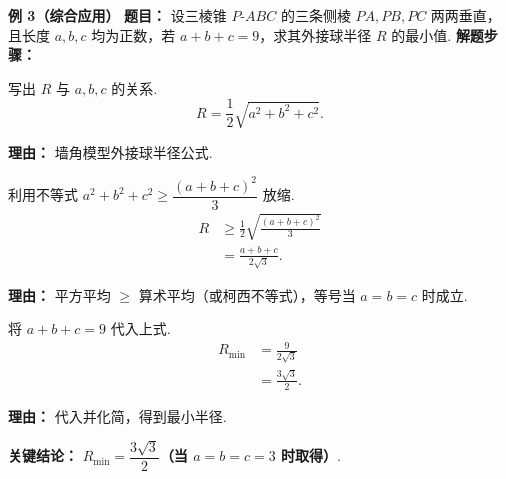\begin{examplebox}
	\medskip
	\textbf{\textcolor{CExample}{例 3（综合应用）}}
	\textbf{\textcolor{CExample}{题目：}}
	设三棱锥 $P$-$ABC$ 的三条侧棱 $PA,PB,PC$ 两两垂直，且长度 $a,b,c$ 均为正数，若 $a+b+c = 9$，求其外接球半径 $R$ 的最小值.
	\textbf{\textcolor{CExample}{解题步骤：}}
	\begin{description}[style=nextline, leftmargin=2.8em, labelsep=0.5em, itemsep=0.45em]
		\item[\textbf{第一步（半径公式）：}]
			写出 $R$ 与 $a,b,c$ 的关系.
			\[
				R = \frac{1}{2}\sqrt{a^{2}+b^{2}+c^{2}}.
			\]
			\par\textbf{理由：} 墙角模型外接球半径公式.
		\item[\textbf{第二步（不等式放缩）：}]
			利用不等式 $a^{2}+b^{2}+c^{2} \ge \dfrac{(a+b+c)^{2}}{3}$ 放缩.
			\[
				\begin{aligned}
					R &\ge \frac{1}{2}\sqrt{\frac{(a+b+c)^{2}}{3}} \\ &= \frac{a+b+c}{2\sqrt{3}}.
			\end{aligned}
			\]
			\par\textbf{理由：} 平方平均 $\ge$ 算术平均（或柯西不等式），等号当 $a=b=c$ 时成立.
		\item[\textbf{第三步（代入定值）：}]
			将 $a+b+c = 9$ 代入上式.
			\[
				\begin{aligned}
					R_{\min} &= \frac{9}{2\sqrt{3}} \\ &= \frac{3\sqrt{3}}{2}.
			\end{aligned}
			\]
			\par\textbf{理由：} 代入并化简，得到最小半径.
	\end{description}
	\textbf{\textcolor{CExample}{关键结论：}}
	\textbf{$R_{\min} = \dfrac{3\sqrt{3}}{2}$（当 $a=b=c=3$ 时取得）}.
\end{examplebox}
